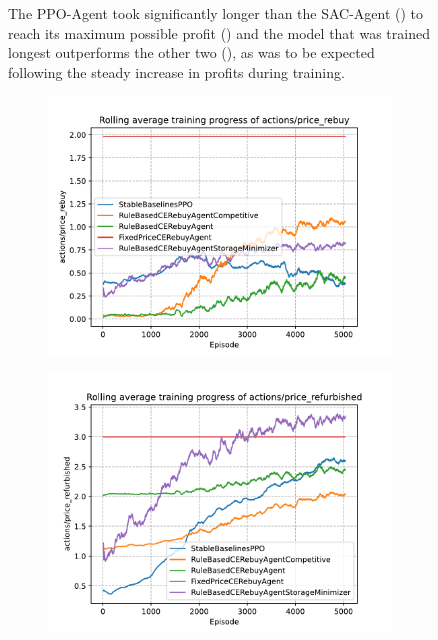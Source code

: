\begin{figure}[ht]
\begin{subfigure}[t]{0.49\textwidth}
		\label{fig:PPOOligopolyCumulativeRewards}
	\end{subfigure}
	\caption{The PPO-Agent took significantly longer than the SAC-Agent () to reach its maximum possible profit () and the model that was trained longest outperforms the other two (), as was to be expected following the steady increase in profits during training.}\label{fig:PPOOligopolyMixed}
\end{figure}

\begin{figure}[ht]
	\centering
	\begin{subfigure}[t]{0.49\textwidth}
		\centering
		\includegraphics[width = \textwidth]{images/experiments/PPOOligopoly/PPOOligopolyLinePriceRebuy.pdf}\\
		\label{fig:PPOOligopolyLinePriceRebuy}
	\end{subfigure}
	\begin{subfigure}[t]{0.49\textwidth}
		\centering
		\includegraphics[width = \textwidth]{images/experiments/PPOOligopoly/PPOOligopolyLinePriceRefurbished.pdf}\\

\end{subfigure}
\end{figure}

